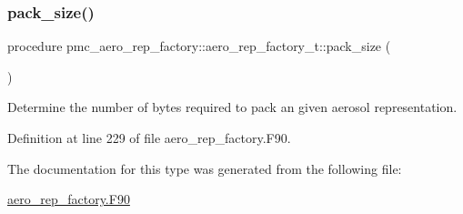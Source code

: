 \subsubsection{\texorpdfstring{pack\+\_\+size()}{pack\_size()}}
{\footnotesize\ttfamily procedure pmc\+\_\+aero\+\_\+rep\+\_\+factory\+::aero\+\_\+rep\+\_\+factory\+\_\+t\+::pack\+\_\+size (\begin{DoxyParamCaption}{ }\end{DoxyParamCaption})\hspace{0.3cm}{\ttfamily [private]}}



Determine the number of bytes required to pack an given aerosol representation. 



Definition at line 229 of file aero\+\_\+rep\+\_\+factory.\+F90.



The documentation for this type was generated from the following file\+:\begin{DoxyCompactItemize}
\item 
\mbox{\hyperlink{aero__rep__factory_8_f90}{aero\+\_\+rep\+\_\+factory.\+F90}}\end{DoxyCompactItemize}
